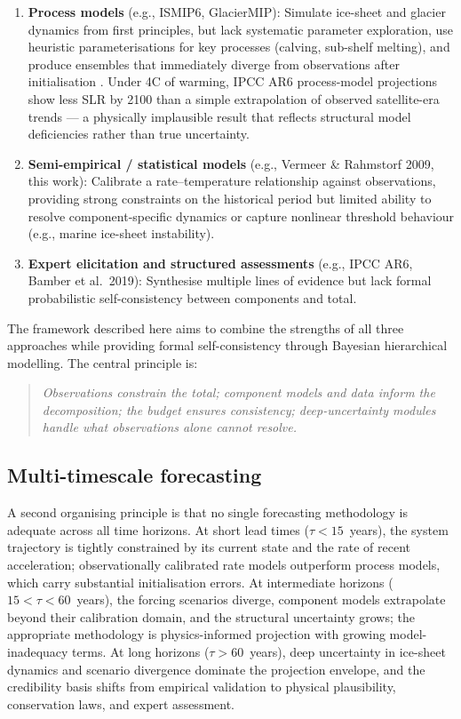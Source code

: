 \documentclass[11pt]{article}
\begin{document}
\begin{enumerate}
  \item \textbf{Process models} (e.g., ISMIP6, GlacierMIP): Simulate ice-sheet and glacier dynamics from first principles, but lack systematic parameter exploration, use heuristic parameterisations for key processes (calving, sub-shelf melting), and produce ensembles that immediately diverge from observations after initialisation \citep{fricker2025antarctica}.  Under 4\textdegree C of warming, IPCC AR6 process-model projections show less SLR by 2100 than a simple extrapolation of observed satellite-era trends --- a physically implausible result that reflects structural model deficiencies rather than true uncertainty.

  \item \textbf{Semi-empirical / statistical models} (e.g., Vermeer \& Rahmstorf 2009, this work): Calibrate a rate--temperature relationship against observations, providing strong constraints on the historical period but limited ability to resolve component-specific dynamics or capture nonlinear threshold behaviour (e.g., marine ice-sheet instability).

  \item \textbf{Expert elicitation and structured assessments} (e.g., IPCC AR6, Bamber et al.\ 2019): Synthesise multiple lines of evidence but lack formal probabilistic self-consistency between components and total.
\end{enumerate}

The framework described here aims to combine the strengths of all three approaches while providing formal self-consistency through Bayesian hierarchical modelling.  The central principle is:

\begin{quote}
\emph{Observations constrain the total; component models and data inform the decomposition; the budget ensures consistency; deep-uncertainty modules handle what observations alone cannot resolve.}
\end{quote}

\subsection{Multi-timescale forecasting}

A second organising principle is that no single forecasting methodology is adequate across all time horizons.  At short lead times ($\tau < 15$~years), the system trajectory is tightly constrained by its current state and the rate of recent acceleration; observationally calibrated rate models outperform process models, which carry substantial initialisation errors.  At intermediate horizons ($15 < \tau < 60$~years), the forcing scenarios diverge, component models extrapolate beyond their calibration domain, and the structural uncertainty grows; the appropriate methodology is physics-informed projection with growing model-inadequacy terms.  At long horizons ($\tau > 60$~years), deep uncertainty in ice-sheet dynamics and scenario divergence dominate the projection envelope, and the credibility basis shifts from empirical validation to physical plausibility, conservation laws, and expert assessment.
\end{document}
